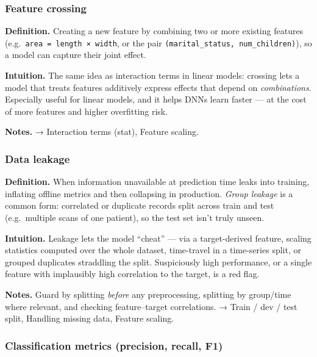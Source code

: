 \documentclass[
  10pt,
  letterpaper,
  onecolumn]{article}
\begin{document}
\hypertarget{feature-crossing}{%
\subsubsection{Feature crossing}\label{feature-crossing}}

\textbf{Definition.} Creating a new feature by combining two or more
existing features (e.g.~\texttt{area\ =\ length\ ×\ width}, or the pair
\texttt{(marital\_status,\ num\_children)}), so a model can capture
their joint effect.

\textbf{Intuition.} The same idea as interaction terms in linear models:
crossing lets a model that treats features additively express effects
that depend on \emph{combinations}. Especially useful for linear models,
and it helps DNNs learn faster --- at the cost of more features and
higher overfitting risk.

\textbf{Notes.} → Interaction terms (stat), Feature scaling.

\hypertarget{data-leakage}{%
\subsubsection{Data leakage}\label{data-leakage}}

\textbf{Definition.} When information unavailable at prediction time
leaks into training, inflating offline metrics and then collapsing in
production. \emph{Group leakage} is a common form: correlated or
duplicate records split across train and test (e.g.~multiple scans of
one patient), so the test set isn't truly unseen.

\textbf{Intuition.} Leakage lets the model ``cheat'' --- via a
target-derived feature, scaling statistics computed over the whole
dataset, time-travel in a time-series split, or grouped duplicates
straddling the split. Suspiciously high performance, or a single feature
with implausibly high correlation to the target, is a red flag.

\textbf{Notes.} Guard by splitting \emph{before} any preprocessing,
splitting by group/time where relevant, and checking feature--target
correlations. → Train / dev / test split, Handling missing data, Feature
scaling.

\hypertarget{classification-metrics-precision-recall-f1}{%
\subsubsection{Classification metrics (precision, recall,
F1)}\label{classification-metrics-precision-recall-f1}}
\end{document}
